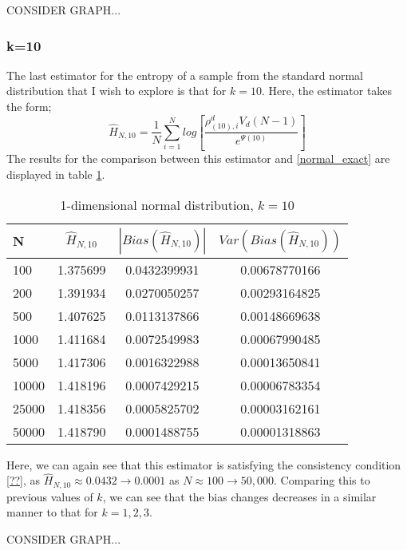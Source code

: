 \documentclass{article}
\begin{document}
CONSIDER GRAPH...


\subsubsection{k=10} \label{N_k=10}
The last estimator for the entropy of a sample from the standard normal distribution that I wish to explore is that for $k=10$. Here, the estimator takes the form;
\begin{equation}
\hat{H}_{N, 10} = \frac{1}{N} \sum_{i=1}^{N} log \left[ \frac{\rho_{(10),i}^{d} V_{d} (N-1)}{e^{\Psi(10)}} \right] \nonumber
\end{equation}
The results for the comparison between this estimator and \ref{normal_exact} are displayed in table \ref{normal_k=10_table}.

\begin{table}
\caption{1-dimensional normal distribution, $k=10$} \label{normal_k=10_table}
\begin{center}
\begin{tabular}{| l | c c c|} 
\toprule
N & $\hat{H}_{N, 10}$ & $|Bias(\hat{H}_{N, 10})|$ & $Var(Bias(\hat{H}_{N, 10}))$ \\
\midrule[1pt]
100     & 1.375699     & 0.0432399931     & 0.00678770166  \\
200     & 1.391934     & 0.0270050257     & 0.00293164825  \\
500     & 1.407625     & 0.0113137866     & 0.00148669638  \\
1000    & 1.411684     & 0.0072549983     & 0.00067990485  \\
5000    & 1.417306     & 0.0016322988     & 0.00013650841  \\
10000   & 1.418196     & 0.0007429215     & 0.00006783354  \\
25000   & 1.418356     & 0.0005825702     & 0.00003162161  \\
50000   & 1.418790     & 0.0001488755     & 0.00001318863  \\
\hline
\end{tabular}
\end{center}
\end{table}

Here, we can again see that this estimator is satisfying the consistency condition \ref{??}, as $\hat{H}_{N, 10} \approx  0.0432 \to 0.0001$ as $N \approx 100 \to 50,000$. Comparing this to previous values of $k$, we can see that the bias changes decreases in a similar manner to that for $k=1, 2, 3$.

CONSIDER GRAPH...
\end{document}
